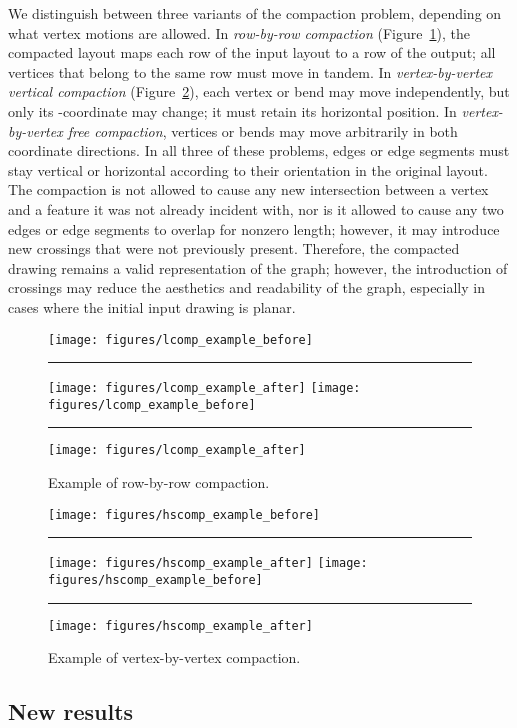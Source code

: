 \documentclass[12pt]{article}
\theoremstyle{definitions}
\begin{document}
We distinguish between three variants of the compaction problem, depending on what vertex motions are allowed. In \emph{row-by-row compaction} (Figure~\ref{fig:rxreg}), the compacted layout maps each row of the input layout to a row of the output; all vertices that belong to the same row must move in tandem. In \emph{vertex-by-vertex vertical compaction} (Figure~\ref{fig:vxveg}), each vertex or bend may move independently, but only its -coordinate may change; it must retain its horizontal position. In \emph{vertex-by-vertex free compaction}, vertices or bends may move arbitrarily in both coordinate directions. In all three of these problems, edges or edge segments must stay vertical or horizontal according to their orientation in the original layout. The compaction is not allowed to cause any new intersection between a vertex and a feature it was not already incident with, nor is it allowed to cause any two edges or edge segments to overlap for nonzero length; however, it may introduce new crossings that were not previously present. Therefore, the compacted drawing remains a valid representation of the graph; however, the introduction of crossings may reduce the aesthetics and readability of the graph, especially in cases where the initial input drawing is planar.

\begin{figure}[ht!]
\centering
\ifFull
\texttt{[image: figures/lcomp\_example\_before]}\rule{4em}{0em}
\texttt{[image: figures/lcomp\_example\_after]}
\else
\texttt{[image: figures/lcomp\_example\_before]}\rule{4em}{0em}
\texttt{[image: figures/lcomp\_example\_after]}
\fi
\caption{Example of row-by-row compaction.}
\label{fig:rxreg}
\end{figure}

\begin{figure}[ht!]
\centering
\ifFull
\texttt{[image: figures/hscomp\_example\_before]}\rule{4em}{0em}
\texttt{[image: figures/hscomp\_example\_after]}
\else
\texttt{[image: figures/hscomp\_example\_before]}\rule{4em}{0em}
\texttt{[image: figures/hscomp\_example\_after]}
\fi
\caption{Example of vertex-by-vertex compaction.}
\label{fig:vxveg}
\end{figure}

\subsection{New results}
\end{document}
